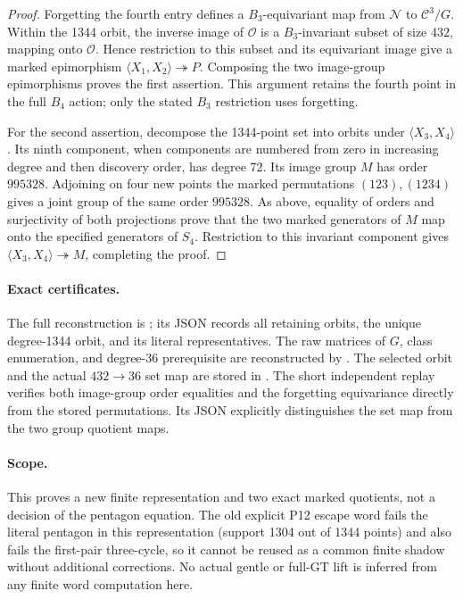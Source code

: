 \begin{proof}
Forgetting the fourth entry defines a $B_3$-equivariant map
from $\mathcal N$ to $\mathcal C^3/G$. Within the 1344 orbit,
the inverse image of $\mathcal O$ is a $B_3$-invariant subset
of size 432, mapping onto $\mathcal O$. Hence restriction to
this subset and its equivariant image give a marked epimorphism
$\langle X_1,X_2\rangle\twoheadrightarrow P$. Composing the
two image-group epimorphisms proves the first assertion. This
argument retains the fourth point in the full $B_4$ action;
only the stated $B_3$ restriction uses forgetting.

For the second assertion, decompose the 1344-point set into
orbits under $\langle X_3,X_4\rangle$. Its ninth component,
when components are numbered from zero in increasing degree
and then discovery order, has degree 72. Its image group $M$
has order $995328$. Adjoining on four new points the marked
permutations $(123),(1234)$ gives a joint group of the same
order $995328$. As above, equality of orders and surjectivity
of both projections prove that the two marked generators of
$M$ map onto the specified generators of $S_4$. Restriction
to this invariant component gives
$\langle X_3,X_4\rangle\twoheadrightarrow M$, completing the
proof.
\end{proof}

\paragraph{Exact certificates.}
The full reconstruction is
; its JSON records all
retaining orbits, the unique degree-1344 orbit, and its literal
representatives. The raw matrices of $G$, class enumeration,
and degree-36 prerequisite are reconstructed by
. The selected
orbit and the actual $432\to36$ set map are stored in
. The short independent
replay  verifies both
image-group order equalities and the forgetting equivariance
directly from the stored permutations. Its JSON explicitly
distinguishes the set map from the two group quotient maps.

\paragraph{Scope.}
This proves a new finite representation and two exact marked
quotients, not a decision of the pentagon equation. The old
explicit P12 escape word fails the literal pentagon in this
representation (support 1304 out of 1344 points) and also
fails the first-pair three-cycle, so it cannot be reused
as a common finite shadow without additional corrections.
No actual gentle or full-GT lift is inferred from any finite
word computation here.
